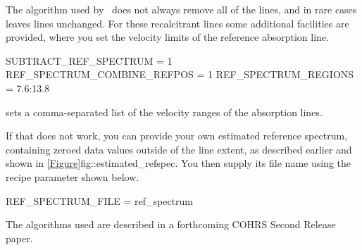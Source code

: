 \documentclass[11pt,oneside,chapters]{starlink}
\begin{document}
The algorithm used by \oracdr\ does not always remove all of
the lines, and in rare cases leaves lines unchanged.  For these
recalcitrant lines some additional facilities are provided, where you
set the velocity limits of the reference absorption line.

\begin{terminalv}
SUBTRACT_REF_SPECTRUM = 1
REF_SPECTRUM_COMBINE_REFPOS = 1
REF_SPECTRUM_REGIONS = 7.6:13.8
\end{terminalv}

 sets a comma-separated list of the
velocity ranges of the absorption lines.

If that does not work, you can provide your own estimated reference
spectrum, containing zeroed data values outside of the line extent, as
described earlier and shown in
\cref{Figure}{fig::estimated_refspec}{}.  You then supply its file
name using the recipe parameter shown below.

\begin{terminalv}
REF_SPECTRUM_FILE = ref_spectrum
\end{terminalv}

The algorithms used are described in a forthcoming COHRS \cite{COHRS}
Second Release paper.
\end{document}
